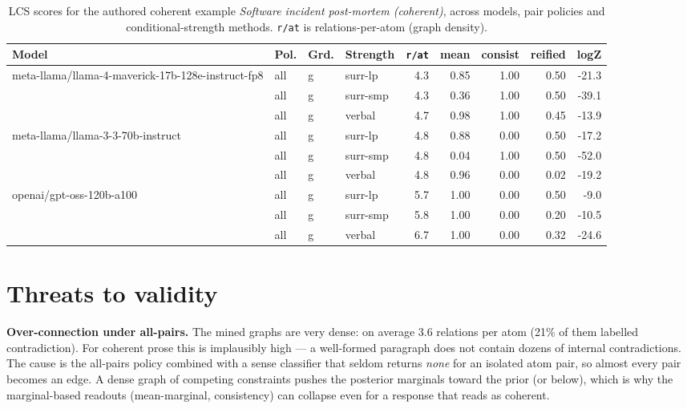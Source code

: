 \documentclass[11pt]{article}
\begin{document}
\begin{table}[htbp]
\centering
\footnotesize
\setlength{\tabcolsep}{4pt}
\caption{LCS scores for the authored coherent example \emph{Software incident post-mortem (coherent)}, across models, pair policies and conditional-strength methods. \texttt{r/at} is relations-per-atom (graph density).}
\label{tab:coherent}
\begin{tabular}{llllrrrrr}
\toprule
\textbf{Model} & \textbf{Pol.} & \textbf{Grd.} & \textbf{Strength} & \texttt{r/at} & mean & consist & reified & logZ \\
\midrule
meta-llama/llama-4-maverick-17b-128e-instruct-fp8 & all & g & surr-lp & 4.3 & 0.85 & 1.00 & 0.50 & -21.3 \\
 & all & g & surr-smp & 4.3 & 0.36 & 1.00 & 0.50 & -39.1 \\
 & all & g & verbal & 4.7 & 0.98 & 1.00 & 0.45 & -13.9 \\
\midrule
meta-llama/llama-3-3-70b-instruct & all & g & surr-lp & 4.8 & 0.88 & 0.00 & 0.50 & -17.2 \\
 & all & g & surr-smp & 4.8 & 0.04 & 1.00 & 0.50 & -52.0 \\
 & all & g & verbal & 4.8 & 0.96 & 0.00 & 0.02 & -19.2 \\
\midrule
openai/gpt-oss-120b-a100 & all & g & surr-lp & 5.7 & 1.00 & 0.00 & 0.50 & -9.0 \\
 & all & g & surr-smp & 5.8 & 1.00 & 0.00 & 0.20 & -10.5 \\
 & all & g & verbal & 6.7 & 1.00 & 0.00 & 0.32 & -24.6 \\
\bottomrule
\end{tabular}
\end{table}


\section{Threats to validity}

\textbf{Over-connection under all-pairs.} The mined graphs are very dense: on average 3.6 relations per atom (21\% of them labelled contradiction). For coherent prose this is implausibly high --- a well-formed paragraph does not contain dozens of internal contradictions. The cause is the all-pairs policy combined with a sense classifier that seldom returns \emph{none} for an isolated atom pair, so almost every pair becomes an edge. A dense graph of competing constraints pushes the posterior marginals toward the prior (or below), which is why the marginal-based readouts (mean-marginal, consistency) can collapse even for a response that reads as coherent.
\end{document}
